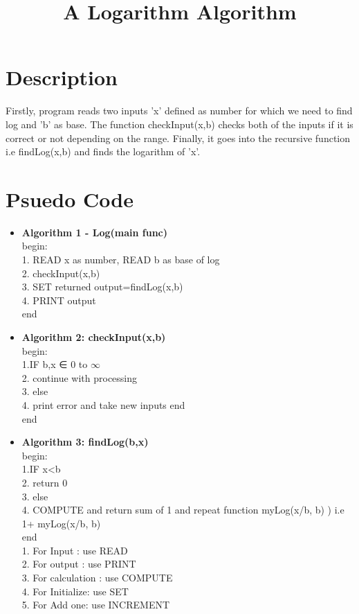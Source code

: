 \documentclass{article}
\title{\textbf {A Logarithm Algorithm}}
\begin{document}
\maketitle

\section{Description}
Firstly, program reads two inputs 'x' defined as number for which we need to find log and 'b' as base. The function checkInput(x,b) checks both of the inputs if it is correct or not depending on the range. Finally, it goes into the recursive function i.e findLog(x,b) and finds the logarithm of 'x'.

\section{Psuedo Code}
\begin{itemize}
\item\textbf{	Algorithm 1 - Log(main func)}\\
begin:  \\
1. READ x as number, READ b as base of log \\
2. checkInput(x,b) \\
3. SET returned output=findLog(x,b) \\
4. PRINT output \\
end


\item\textbf{	Algorithm 2: checkInput(x,b)} \\
begin: \\
1.IF b,x ∈ 0 to $\infty$ \\
2. continue with processing \\
3. else \\
4. print error and take new inputs end \\
end

\item\textbf{	Algorithm 3: findLog(b,x)} \\
begin: \\
1.IF x<b\\ 
2. return 0\\ 
3. else \\
4. COMPUTE and return sum of 1 and repeat function myLog(x/b, b) ) i.e 1+ myLog(x/b, b)\\
end\\

 
1. For Input : use READ \\
2. For output : use PRINT \\
3. For calculation : use COMPUTE \\
4. For Initialize: use SET \\
5. For Add one: use INCREMENT\\
\end{itemize}

\end{document}
